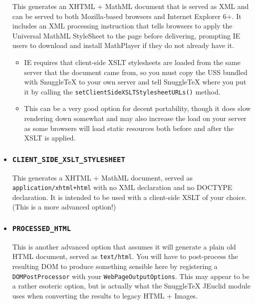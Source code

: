 \begin{itemize}
  This generates an XHTML + MathML document that is served as XML and can be
  served to both Mozilla-based browsers and Internet Explorer 6+. It includes an
  XML processing instruction that tells browsers to apply the Universal MathML
  StyleSheet to the page before delivering, prompting IE users to download and
  install MathPlayer if they do not already have it.
  \begin{itemize}
    \item IE requires that client-side XSLT stylesheets are loaded from the same server
      that the document came from, so you must copy the USS bundled with SnuggleTeX to
      your own server and tell SnuggleTeX where you put it by calling the
      \verb|setClientSideXSLTStylesheetURLs()| method.
    \item This can be a very good option for decent portability, though it does slow
      rendering down somewhat and may also increase the load on your server as some
      browsers will load static resources both before and after the XSLT is applied.
  \end{itemize}

\item
  \subsubsection*{\verb|CLIENT_SIDE_XSLT_STYLESHEET|}

  This generates a XHTML + MathML document,
  served as \verb|application/xhtml+html| with no XML declaration and no DOCTYPE declaration.
  It is intended to be used with a client-side XSLT of your choice.
  (This is a more advanced option!)

\item
  \subsubsection*{\verb|PROCESSED_HTML|}

  This is another advanced option that assumes it will generate a plain old
  HTML document, served as \verb|text/html|.
  You will have to post-process the resulting DOM to produce something sensible here
  by registering a \verb|DOMPostProcessor| with your \verb|WebPageOutputOptions|.
  This may appear to be a rather esoteric option, but is actually what the SnuggleTeX JEuclid
  module uses when converting the results to legacy HTML + Images.
\end{itemize}




